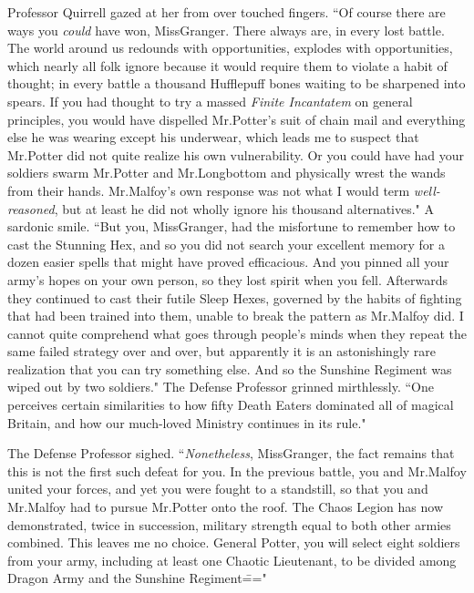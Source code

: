 Professor Quirrell gazed at her from over touched fingers. ``Of course there are ways you \emph{could} have won, Miss\?Granger. There always are, in every lost battle. The world around us redounds with opportunities, explodes with opportunities, which nearly all folk ignore because it would require them to violate a habit of thought; in every battle a thousand Hufflepuff bones waiting to be sharpened into spears. If you had thought to try a massed \emph{Finite Incantatem} on general principles, you would have dispelled Mr.\?Potter's suit of chain mail and everything else he was wearing except his underwear, which leads me to suspect that Mr.\?Potter did not quite realize his own vulnerability. Or you could have had your soldiers swarm Mr.\?Potter and Mr.\?Longbottom and physically wrest the wands from their hands. Mr.\?Malfoy's own response was not what I would term \emph{well-reasoned}, but at least he did not wholly ignore his thousand alternatives." A sardonic smile. ``But you, Miss\?Granger, had the misfortune to remember how to cast the Stunning Hex, and so you did not search your excellent memory for a dozen easier spells that might have proved efficacious. And you pinned all your army's hopes on your own person, so they lost spirit when you fell. Afterwards they continued to cast their futile Sleep Hexes, governed by the habits of fighting that had been trained into them, unable to break the pattern as Mr.\?Malfoy did. I cannot quite comprehend what goes through people's minds when they repeat the same failed strategy over and over, but apparently it is an astonishingly rare realization that you can try something else. And so the Sunshine Regiment was wiped out by two soldiers." The Defense Professor grinned mirthlessly. ``One perceives certain similarities to how fifty Death Eaters dominated all of magical Britain, and how our much-loved Ministry continues in its rule."

The Defense Professor sighed. ``\emph{Nonetheless}, Miss\?Granger, the fact remains that this is not the first such defeat for you. In the previous battle, you and Mr.\?Malfoy united your forces, and yet you were fought to a standstill, so that you and Mr.\?Malfoy had to pursue Mr.\?Potter onto the roof. The Chaos Legion has now demonstrated, twice in succession, military strength equal to both other armies combined. This leaves me no choice. General Potter, you will select eight soldiers from your army, including at least one Chaotic Lieutenant, to be divided among Dragon Army and the Sunshine Regiment\==="

